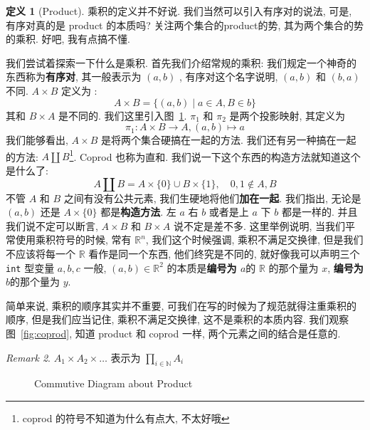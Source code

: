 \documentclass[10pt]{ctexart}
\theoremstyle{definition}
\theoremstyle{definition}
\newtheorem{definition}{定义}[section]
\theoremstyle{plain}
\theoremstyle{remark}
\newtheorem{remark}[definition]{Remark}
\begin{document}
\begin{definition}[Product]
乘积的定义并不好说. 我们当然可以引入有序对的说法, 可是, 有序对真的是 product 的本质吗? 关注两个集合的product的势, 其为两个集合的势的乘积. 好吧, 我有点搞不懂. 

我们尝试着探索一下什么是乘积. 首先我们介绍常规的乘积: 我们规定一个神奇的东西称为\textbf{有序对}, 其一般表示为 \((a, b ) \) , 有序对这个名字说明, \((a, b ) \) 和 \( (b, a)\) 不同. \(A \times B \) 定义为 : 
\begin{equation}
		A \times B  = \{  (a, b ) \mid a \in A , B \in b \} 
\end{equation}
其和 \(B \times A\) 是不同的. 我们这里引入图~\ref{fig:product}.  \(\pi_{1}\) 和 \(\pi_{2}\) 是两个投影映射, 
其定义为
\begin{equation}
\pi_{1} \colon A \times B \to A , (a, b ) \mapsto a 
\end{equation}
我们能够看出, \(A \times B \) 是将两个集合硬搞在一起的方法. 我们还有另一种搞在一起的方法: \(A \coprod B\)\footnote{ coprod 的符号不知道为什么有点大, 不太好哦}. Coprod 也称为直和. 我们说一下这个东西的构造方法就知道这个是什么了:
\begin{equation}
		A \coprod B = A \times \{0\} \cup B \times \{ 1\}, \quad 0 , 1 \notin A , B 
\end{equation}
不管 \(A\) 和 \(B\) 之间有没有公共元素, 我们生硬地将他们\textbf{加在一起}. 我们指出,  无论是 \((a, b)\) 还是 \(A \times \{0\}\) 都是\textbf{构造方法}. 左 \(a\) 右 \(b\) 或者是上 \(a\) 下 \(b\) 都是一样的. 并且我们说不定可以断言,  \(A \times B\) 和 \(B \times A \) 说不定是差不多. 这里举例说明, 当我们平常使用乘积符号的时候, 常有 \(\mathbb R ^{n}\), 我们这个时候强调, 乘积不满足交换律, 但是我们不应该将每一个 \(\mathbb R\) 看作是同一个东西, 他们终究是不同的, 就好像我可以声明三个 \verb|int| 型变量 \(a, b ,c \) 一般, \((a, b) \in \mathbb R ^{2}\) 的本质是\textbf{编号为 \(a\)}的 \(\mathbb{R}\) 的那个量为 \(x\), \textbf{编号为 \(b\)}的那个量为 \(y\). 

简单来说, 乘积的顺序其实并不重要, 可我们在写的时候为了规范就得注重乘积的顺序, 但是我们应当记住, 乘积不满足交换律, 这不是乘积的本质内容. 我们观察图~\ref{fig:coprod}, 知道 product 和 coprod 一样, 两个元素之间的结合是任意的. 
\end{definition}
\begin{remark}
\(A_{1} \times A_{2} \times \dots\) 表示为 \(\prod _{i \in \mathbb{N} } A_{i}\)
\end{remark}
\begin{figure}
\centering	
{}
\caption{Commutive Diagram about Product}\label{fig:product}
\end{figure}
\end{document}
